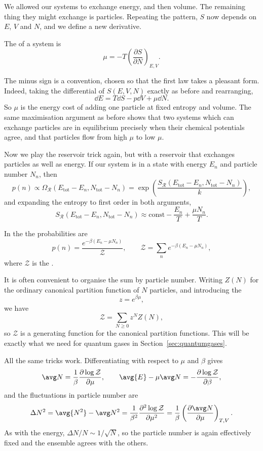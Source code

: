 We allowed our systems to exchange energy, and then volume. The remaining thing they might exchange is particles. Repeating the pattern, $S$ now depends on $E$, $V$ and $N$, and we define a new derivative.

\begin{definition}
	The  of a system is
	$$
	\mu = -T\left(\frac{\partial S}{\partial N}\right)_{E,V}.
	$$
\end{definition}

The minus sign is a convention, chosen so that the first law takes a pleasant form. Indeed, taking the differential of $S(E,V,N)$ exactly as before and rearranging,
$$
\dd E = T\dd S - p\dd V + \mu\dd N.
$$
So $\mu$ is the energy cost of adding one particle at fixed entropy and volume. The same maximisation argument as before shows that two systems which can exchange particles are in equilibrium precisely when their chemical potentials agree, and that particles flow from high $\mu$ to low $\mu$.

Now we play the reservoir trick again, but with a reservoir that exchanges particles as well as energy. If our system is in a state with energy $E_n$ and particle number $N_n$, then
$$
p(n) \propto \Omega_{\mathcal R}(E_{\mathrm{tot}} - E_n, N_{\mathrm{tot}} - N_n) = \exp\left(\frac{S_{\mathcal R}(E_{\mathrm{tot}} - E_n, N_{\mathrm{tot}} - N_n)}{k}\right),
$$
and expanding the entropy to first order in both arguments,
$$
S_{\mathcal R}(E_{\mathrm{tot}} - E_n, N_{\mathrm{tot}} - N_n) \approx \text{const} - \frac{E_n}{T} + \frac{\mu N_n}{T}.
$$

\begin{definition}
	In the  the probabilities are
	$$
	p(n) = \frac{e^{-\beta(E_n - \mu N_n)}}{\mathcal Z}, \qquad \mathcal Z = \sum_n e^{-\beta(E_n - \mu N_n)},
	$$
	where $\mathcal Z$ is the .
\end{definition}

It is often convenient to organise the sum by particle number. Writing $Z(N)$ for the ordinary canonical partition function of $N$ particles, and introducing the 
$$
z = e^{\beta\mu},
$$
we have
$$
\mathcal Z = \sum_{N \geq 0} z^N Z(N),
$$
so $\mathcal Z$ is a generating function for the canonical partition functions. This will be exactly what we need for quantum gases in Section~\ref{sec:quantumgases}.

All the same tricks work. Differentiating with respect to $\mu$ and $\beta$ gives
$$
\avg N = \frac{1}{\beta}\frac{\partial \log \mathcal Z}{\partial \mu}, \qquad \avg{E} - \mu \avg N = -\frac{\partial \log \mathcal Z}{\partial \beta},
$$
and the fluctuations in particle number are
$$
\Delta N^2 = \avg{N^2} - \avg N^2 = \frac{1}{\beta^2}\frac{\partial^2 \log \mathcal Z}{\partial \mu^2} = \frac{1}{\beta}\left(\frac{\partial \avg N}{\partial\mu}\right)_{T,V}.
$$
As with the energy, $\Delta N/N \sim 1/\sqrt N$, so the particle number is again effectively fixed and the ensemble agrees with the others.

